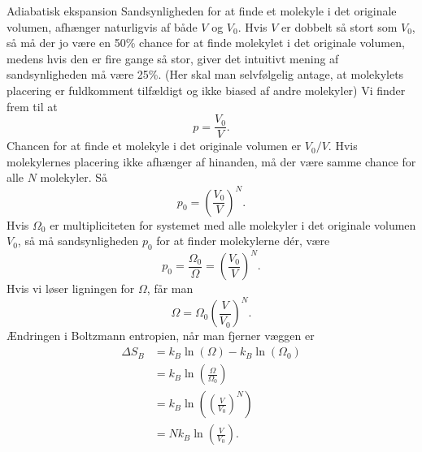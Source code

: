 \begin{opgave}{Adiabatisk ekspansion}
    \opg Sandsynligheden for at finde et molekyle i det originale volumen, afhænger naturligvis af både $V$ og $V_0$. Hvis $V$ er dobbelt så stort som $V_0$, så må der jo være en 50\% chance for at finde molekylet i det originale volumen, medens hvis den er fire gange så stor, giver det intuitivt mening af sandsynligheden må være 25\%. (Her skal man selvfølgelig antage, at molekylets placering er fuldkomment tilfældigt og ikke biased af andre molekyler) Vi finder frem til at 
    \[ p=\frac{V_0}{V}. \]
    \opg Chancen for at finde et molekyle i det originale volumen er $V_0/V$. Hvis molekylernes placering ikke afhænger af hinanden, må der være samme chance for alle $N$ molekyler. Så
    \[ p_0=\left(\frac{V_0}{V}\right)^N. \]
    \opg Hvis $\Omega_0$ er multipliciteten for systemet med alle molekyler i det originale volumen $V_0$, så må sandsynligheden $p_0$ for at finder molekylerne dér, være
    \[ p_0=\frac{\Omega_0}{\Omega}=\left(\frac{V_0}{V}\right)^N. \]
    Hvis vi løser ligningen for $\Omega$, får man
    \[ \Omega=\Omega_0\left(\frac{V}{V_0}\right)^N. \]
    \opg Ændringen i Boltzmann entropien, når man fjerner væggen er
    \begin{align*}
        \Delta S_B&=k_B\ln(\Omega)-k_B\ln(\Omega_0)\\
        &=k_B\ln\left(\frac{\Omega}{\Omega_0}\right)\\
        &=k_B\ln\left(\left(\frac{V}{V_0}\right)^N\right)\\
        &=Nk_B\ln\left(\frac{V}{V_0}\right).
    \end{align*}
\end{opgave}

